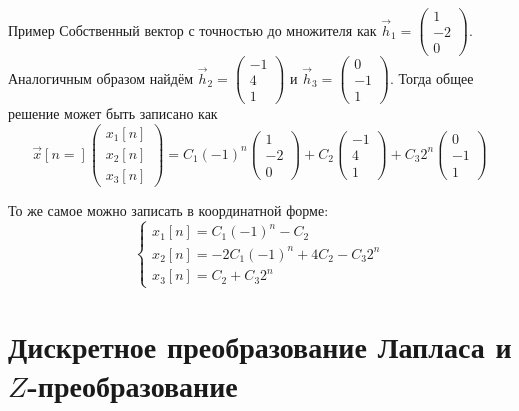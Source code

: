 \documentclass[12pt,twoside]{report}
\theoremstyle{MyNonumberplain}
\begin{document}
\begin{example}{Пример}
        Собственный вектор с точностью до множителя как $\vec{h}_1=\begin{pmatrix}1 \\-2 \\0\end{pmatrix}$. 
        Аналогичным образом найдём $\vec{h}_2=\begin{pmatrix}-1 \\4 \\1\end{pmatrix}$ и 
        $\vec{h}_3=\begin{pmatrix}0 \\-1 \\1\end{pmatrix}$. Тогда общее решение может быть записано как
        \begin{equation*}
            \vec{x}[n=]\begin{pmatrix}x_1[n]\\x_2[n]\\x_3[n]\end{pmatrix} =
                C_1 (-1)^n\begin{pmatrix}1 \\-2 \\0\end{pmatrix} 
                +C_2\begin{pmatrix}-1 \\4 \\1\end{pmatrix}
                +C_3 2^n\begin{pmatrix}0 \\-1 \\1\end{pmatrix}
        \end{equation*}

        То же самое можно записать в координатной форме:
        \[\begin{cases}
            x_1[n]=C_1(-1)^n-C_2\\
            x_2[n]=-2C_1(-1)^n+4C_2-C_3 2^n\\
            x_3[n]=C_2+C_3 2^n
        \end{cases}\]
\end{example}


    \chapter{Дискретное преобразование Лапласа и $Z$-преобразование}
\end{document}

